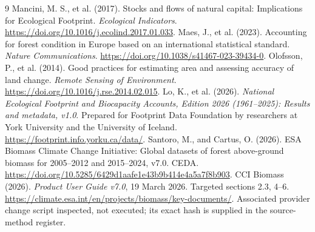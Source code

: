 \documentclass[11pt,a4paper]{article}
\begin{document}
\begin{thebibliography}{9}
 Mancini, M. S., et al. (2017). Stocks and flows of natural capital: Implications for Ecological Footprint. \emph{Ecological Indicators}. \url{https://doi.org/10.1016/j.ecolind.2017.01.033}.
 Maes, J., et al. (2023). Accounting for forest condition in Europe based on an international statistical standard. \emph{Nature Communications}. \url{https://doi.org/10.1038/s41467-023-39434-0}.
 Olofsson, P., et al. (2014). Good practices for estimating area and assessing accuracy of land change. \emph{Remote Sensing of Environment}. \url{https://doi.org/10.1016/j.rse.2014.02.015}.
 Lo, K., et al. (2026). \emph{National Ecological Footprint and Biocapacity Accounts, Edition 2026 (1961--2025): Results and metadata, v1.0}. Prepared for Footprint Data Foundation by researchers at York University and the University of Iceland. \url{https://footprint.info.yorku.ca/data/}.
 Santoro, M., and Cartus, O. (2026). ESA Biomass Climate Change Initiative: Global datasets of forest above-ground biomass for 2005--2012 and 2015--2024, v7.0. CEDA. \url{https://doi.org/10.5285/6429d1aafe1e43b9b414e4a5a7f8b903}.
 CCI Biomass (2026). \emph{Product User Guide v7.0}, 19 March 2026. Targeted sections 2.3, 4--6. \url{https://climate.esa.int/en/projects/biomass/key-documents/}. Associated provider change script inspected, not executed; its exact hash is supplied in the source-method register.
\end{thebibliography}
\end{document}
